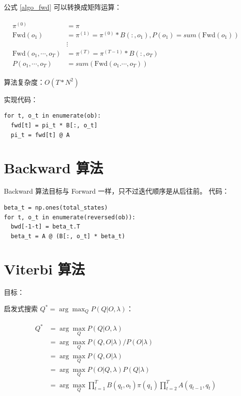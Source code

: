 \documentclass[degree=project,degree-type=project,cjk-font=noto]{thuthesis}
\begin{document}
  公式 \ref{algo_fwd} 可以转换成矩阵运算：

  \begin{align}
    \begin{split}
      \pi^{(0)} &= \pi \\
      \text{Fwd}(o_1) &= \pi^{(1)} = \pi^{(0)} * B(:, o_1), P(o_1) = sum(\text{Fwd}(o_1)) \\
      &\vdots \\
      \text{Fwd}(o_1, \cdots, o_T) &= \pi^{(T)} = \pi^{(T-1)} * B(:, o_T) \\
      P(o_1, \cdots, o_T) &= sum(\text{Fwd}(o_1. \cdots, o_T))
    \end{split}
  \end{align}

  算法复杂度：$O(T * N^2)$

  实现代码：

  \begin{verbatim}
for t, o_t in enumerate(ob):
  fwd[t] = pi_t * B[:, o_t]
  pi_t = fwd[t] @ A
  \end{verbatim}


\section{Backward 算法}

Backward 算法目标与 Forward 一样，只不过迭代顺序是从后往前。
代码：

  \begin{verbatim}
beta_t = np.ones(total_states)
for t, o_t in enumerate(reversed(ob)):
  bwd[-1-t] = beta_t.T
  beta_t = A @ (B[:, o_t] * beta_t)
  \end{verbatim}

\section{Viterbi 算法}

目标：

启发式搜索 $Q^* = \arg \max_Q P(Q | O, \lambda)$：

\begin{align}
  \begin{split}
    Q^* &= \arg \max_Q P(Q | O, \lambda) \\
    &= \arg \max_Q P(Q, O | \lambda) / P(O | \lambda) \\
    &= \arg \max_Q P(Q, O | \lambda) \\
    &= \arg \max_Q P(O | Q, \lambda) P(Q | \lambda) \\
    &= \arg \max_Q \prod_{t=1}^T B(q_t, o_t) \pi(q_1) \prod_{t=2}^T A(q_{t-1}, q_t)
  \end{split}
  \label{algo_viterbi}
\end{align}
\end{document}

